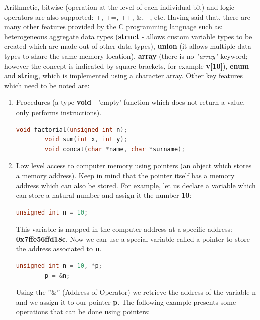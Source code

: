 \documentclass[12pt]{article}
\begin{document}
Arithmetic, bitwise (operation at the level of each individual bit) and logic operators are also supported: +, +=, ++, \&, $||$, etc. Having said that, there are many other features provided by the C programming language such as: heterogeneous aggregate data types (\textbf{struct} - allows custom variable types to be created which are made out of other data types), \textbf{union} (it allows multiple data types to share the same memory location), \textbf{array} (there is no \textit{"array"} keyword; however the concept is indicated by square brackets, for example \textbf{v[10]}), \textbf{enum} and \textbf{string}, which is implemented using a character array.\newline\newline
Other key features which need to be noted are:

\begin{enumerate}
    \item Procedures (a type \textbf{void} - 'empty' function which does not return a value, only performs instructions). 

    \begin{lstlisting}[language=C]
        void factorial(unsigned int n);
        void sum(int x, int y);
        void concat(char *name, char *surname);
    \end{lstlisting}

    \item Low level access to computer memory using pointers (an object which stores a memory address). Keep in mind that the pointer itself has a memory address which can also be stored. For example, let us declare a variable which can store a natural number and assign it the number \textbf{10}:

    \begin{lstlisting}[language=C]
        unsigned int n = 10;
    \end{lstlisting}

    This variable is mapped in the computer address at a specific address: \textbf{0x7ffe56ffd18c}. Now we can use a special variable called a pointer to store the address associated to \textbf{n}.

    \begin{lstlisting}[language=C]
        unsigned int n = 10, *p;
        p = &n;
    \end{lstlisting}

   Using the ”$\&$” (Address-of Operator) we retrieve the address of the variable n and we assign it to our pointer \textbf{p}. The following example presents some operations that can be done using pointers:


\end{enumerate}
\end{document}
